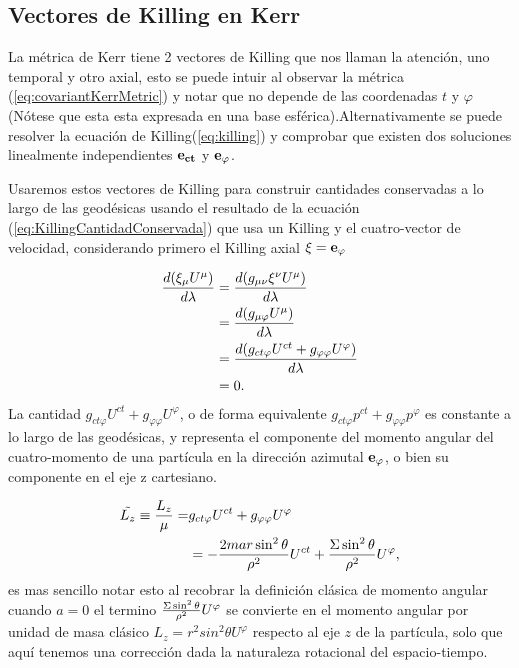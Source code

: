 \subsection{Vectores de Killing en Kerr}
La métrica de Kerr tiene 2 vectores de Killing que nos llaman la atención, uno temporal y otro axial, esto se puede intuir al observar la métrica (\ref{eq:covariantKerrMetric}) y notar que no depende de las coordenadas $t$ y $\varphi$ (Nótese que esta esta expresada en una base esférica).Alternativamente se puede resolver la ecuación de Killing(\ref{eq:killing}) y comprobar que existen dos soluciones linealmente independientes $\mathbf{e_{ct}}$ y $\mathbf{e_\varphi}$.

Usaremos estos vectores de Killing para construir cantidades conservadas a lo largo de las geodésicas usando el resultado de la ecuación (\ref{eq:KillingCantidadConservada}) que usa un Killing y el cuatro-vector de velocidad, considerando primero el Killing axial $\mathbf{\xi}=\mathbf{e_\varphi}$

\begin{align}
    \frac{d (\xi_\mu U^\mu)}{d \lambda} & = \frac{d (g_{\mu\nu} \xi^\nu U^\mu)}{d \lambda}                               \\
                                 & =\frac{d (g_{\mu\varphi}  U^\mu)}{d \lambda}                                   \\
                                 & =\frac{d (g_{ ct \varphi}  U^{ct} + g_{\varphi\varphi}  U^\varphi)}{d \lambda} \\
                                 & =0 .
\end{align}
La cantidad $g_{ ct \varphi}  U^{ct} + g_{\varphi\varphi}  U^\varphi$, o de forma equivalente $g_{ ct \varphi}  p^{ct} + g_{\varphi\varphi}  p^\varphi$ es constante a lo largo de las geodésicas, y representa el componente del momento angular del cuatro-momento de una partícula en la dirección azimutal $\mathbf{e_\varphi}$, o bien su componente en el eje z cartesiano.

\begin{equation}
    \begin{aligned}
        \tilde{L_z}  \equiv\frac{L_z}{\mu} = & g_{ ct \varphi}  U^{ct} + g_{\varphi\varphi}  U^\varphi                                    \\
                                             & =- \frac{2 mar \sin^2\theta}{\rho^2}   U^{ct} + \frac{\Sigma \sin^2\theta}{\rho^2}  U^\varphi,
    \end{aligned}
\end{equation}
es mas sencillo notar esto al recobrar la definición clásica de momento angular cuando  $a=0$ el termino  $\frac{\Sigma \sin^2\theta}{\rho^2} U^\varphi$ se convierte en el momento angular por unidad de masa clásico $L_z= r^2 sin^2\theta U^\varphi$ respecto al eje $z$ de la partícula, solo que aquí tenemos una corrección dada la naturaleza rotacional del espacio-tiempo.

